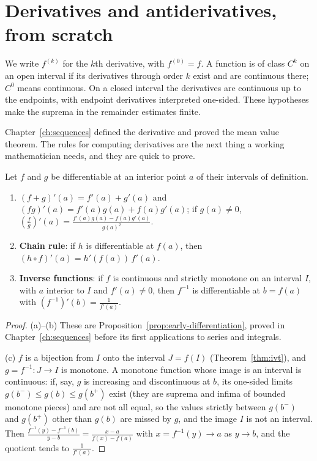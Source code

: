 
\section{Derivatives and antiderivatives, from scratch}

We write $f^{(k)}$ for the $k$th derivative, with $f^{(0)}=f$.
A function is of class $C^k$ on an open interval if its derivatives through
order $k$ exist and are continuous there; $C^0$ means continuous.
On a closed interval the derivatives are continuous up to the endpoints,
with endpoint derivatives interpreted one-sided. These hypotheses make the
suprema in the remainder estimates finite.

Chapter~\ref{ch:sequences} defined the derivative and proved the mean value theorem. The rules for computing derivatives are the next thing a working mathematician
needs, and they are quick to prove.

\begin{propositionx}
Let $f$ and $g$ be differentiable at an interior point $a$ of their intervals of definition.
\begin{enumerate}[label=(\alph*)]
\item $(f+g)'(a)=f'(a)+g'(a)$ and $(fg)'(a)=f'(a)g(a)+f(a)g'(a)$; if $g(a)\ne0$, $\left(\frac fg\right)'(a)=\frac{f'(a)g(a)-f(a)g'(a)}{g(a)^2}$.
\item \textbf{Chain rule}: if $h$ is differentiable at $f(a)$, then $(h\circ f)'(a)=h'(f(a))\,f'(a)$.
\item \textbf{Inverse functions}: if $f$ is continuous and strictly monotone on an interval $I$, with $a$ interior to $I$ and $f'(a)\ne0$, then $f^{-1}$ is differentiable at $b=f(a)$ with $(f^{-1})'(b)=\frac1{f'(a)}$.
\end{enumerate}
\end{propositionx}
\begin{proof}
(a)--(b) These are Proposition~\ref{prop:early-differentiation}, proved in
Chapter~\ref{ch:sequences} before its first applications to series and integrals.

(c) $f$ is a bijection from $I$ onto the interval $J=f(I)$ (Theorem~\ref{thm:ivt}), and $g=f^{-1}:J\to I$ is monotone. A monotone function whose image is an interval is continuous: if, say, $g$ is increasing and discontinuous at $b$, its one-sided limits $g(b^-)\le g(b)\le g(b^+)$ exist (they are suprema and infima of bounded monotone pieces) and are not all equal, so the values strictly between $g(b^-)$ and $g(b^+)$ other than $g(b)$ are missed by $g$, and the image $I$ is not an interval. Then
$\frac{f^{-1}(y)-f^{-1}(b)}{y-b}=\frac{x-a}{f(x)-f(a)}$ with $x=f^{-1}(y)\to a$ as $y\to b$, and the quotient tends to $\frac1{f'(a)}$.
\end{proof}

